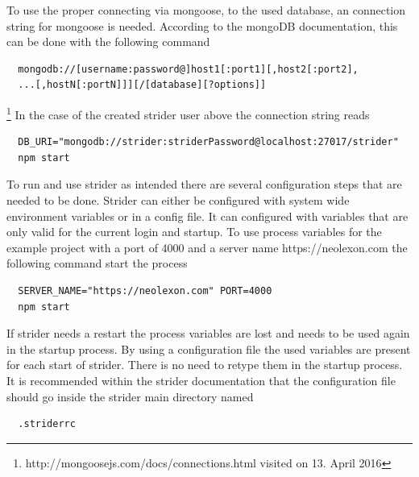 To use the proper connecting via mongoose, to the used database, an connection string for mongoose is needed. According to the mongoDB
documentation, this can be done with the following command
\begin{lstlisting}
  mongodb://[username:password@]host1[:port1][,host2[:port2],
  ...[,hostN[:portN]]][/[database][?options]]
\end{lstlisting}
\footnote{http://mongoosejs.com/docs/connections.html visited on 13. April 2016}
In the case of the created strider user above the connection string reads
\begin{lstlisting}
  DB_URI="mongodb://strider:striderPassword@localhost:27017/strider"
  npm start
\end{lstlisting}

To run and use strider as intended there are several configuration steps that are needed to be done. Strider can either be configured
with system wide environment variables or in a config file. It can configured with variables that are only valid for the current login and
startup. To use process variables for the example project with a port of 4000 and a server name https://neolexon.com the following
command start the process

\begin{lstlisting}
  SERVER_NAME="https://neolexon.com" PORT=4000
  npm start
\end{lstlisting}

If strider needs a restart the process variables are lost and needs to be used again in the startup process. By using a configuration file
the used variables are present for each start of strider. There is no need to retype them in the startup process. It is recommended within
the strider documentation that the configuration file should go inside the strider main directory named

\begin{lstlisting}
  .striderrc
\end{lstlisting}

